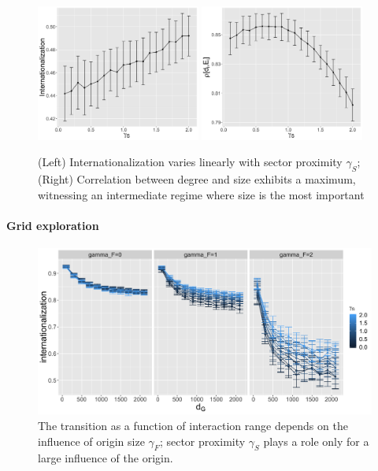 \documentclass{article}
\begin{document}
\begin{figure}
    \includegraphics[width=0.48\textwidth]{figures/internationalization-gammaSectors_errorbars.png}
    \includegraphics[width=0.48\textwidth]{figures/rhoDegreeSize-gammaSectors_errorbars.png}
    \caption{(Left) Internationalization varies linearly with sector proximity $\gamma_S$; (Right) Correlation between degree and size exhibits a maximum, witnessing an intermediate regime where size is the most important}
\end{figure}


\paragraph{Grid exploration}

\begin{figure}
    \includegraphics[width=\textwidth]{figures/internationalization_countryGravityDecay200_gammaDestination0_facetwrapgammaOrigin_colorgammaSectors.png}
    \caption{The transition as a function of interaction range depends on the influence of origin size $\gamma_F$; sector proximity $\gamma_S$ plays a role only for a large influence of the origin.}
\end{figure}
\end{document}
